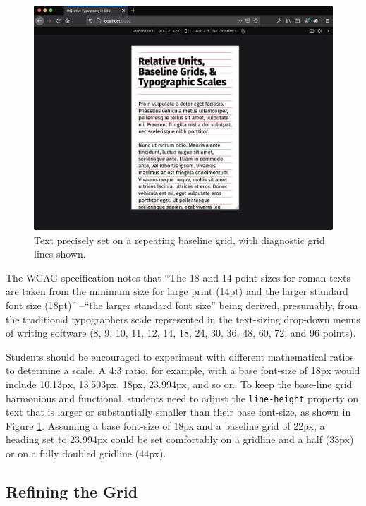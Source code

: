 \documentclass[sigplan,screen]{acmart}
\begin{document}
\begin{figure}
  \includegraphics[width=\linewidth]{rdv-narrow}
  \caption{Text precisely set on a repeating baseline grid, with diagnostic grid lines shown.}
  \label{fig:rdv-narrow}
\end{figure}

The WCAG specification notes that “The 18 and 14 point sizes for roman texts are taken from the minimum size for large print (14pt) and the larger standard font size (18pt)” \cite{w3c:wcag}--“the larger standard font size” being derived, presumably, from the traditional typographers scale represented in the text-sizing drop-down menus of writing software (8, 9, 10, 11, 12, 14, 18, 24, 30, 36, 48, 60, 72, and 96 points).

Students should be encouraged to experiment with different mathematical ratios to determine a scale. A 4:3 ratio, for example, with a base font-size of 18px would include 10.13px, 13.503px, 18px, 23.994px, and so on.  To keep the base-line grid harmonious and functional, students need to adjust the \verb|line-height| property on text that is larger or substantially smaller than their base font-size, as shown in Figure \ref{fig:rdv-narrow}. Assuming a base font-size of 18px and a baseline grid of 22px, a heading set to 23.994px could be set comfortably on a gridline and a half (33px) or on a fully doubled gridline (44px).

\subsection{Refining the Grid}
\end{document}
